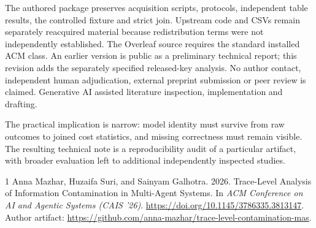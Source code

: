 \documentclass[sigconf,nonacm]{acmart}
\begin{document}
The authored package preserves acquisition scripts, protocols, independent table results, the controlled fixture and strict join. Upstream code and CSVs remain separately reacquired material because redistribution terms were not independently established. The Overleaf source requires the standard installed ACM class. An earlier version is public as a preliminary technical report; this revision adds the separately specified released-key analysis. No author contact, independent human adjudication, external preprint submission or peer review is claimed. Generative AI assisted literature inspection, implementation and drafting.

The practical implication is narrow: model identity must survive from raw outcomes to joined cost statistics, and missing correctness must remain visible. The resulting technical note is a reproducibility audit of a particular artifact, with broader evaluation left to additional independently inspected studies.

\begin{thebibliography}{1}
 Anna Mazhar, Huzaifa Suri, and Sainyam Galhotra. 2026. Trace-Level Analysis of Information Contamination in Multi-Agent Systems. In \emph{ACM Conference on AI and Agentic Systems (CAIS '26)}. \url{https://doi.org/10.1145/3786335.3813147}. Author artifact: \url{https://github.com/anna-mazhar/trace-level-contamination-mas}.
\end{thebibliography}
\end{document}
